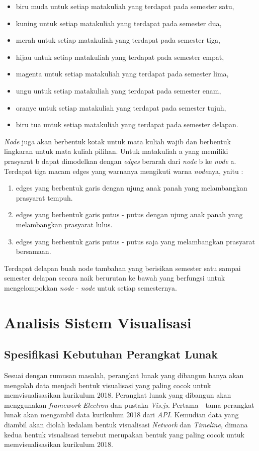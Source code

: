 \begin{itemize}
    \item biru muda untuk setiap matakuliah yang terdapat pada semester satu,
    \item kuning untuk setiap matakuliah yang terdapat pada semester dua,
    \item merah untuk setiap matakuliah yang terdapat pada semester tiga,
    \item hijau untuk setiap matakuliah yang terdapat pada semester empat,
    \item magenta untuk setiap matakuliah yang terdapat pada semester lima,
    \item ungu untuk setiap matakuliah yang terdapat pada semester enam,
    \item oranye untuk setiap matakuliah yang terdapat pada semester tujuh,
    \item biru tua untuk setiap matakuliah yang terdapat pada semester delapan.
\end{itemize}
\textit{Node} juga akan berbentuk kotak untuk mata kuliah wajib dan berbentuk lingkaran untuk mata kuliah pilihan. Untuk matakuliah a yang memiliki prasyarat b dapat dimodelkan dengan \textit{edges} berarah dari \textit{node} b ke \textit{node} a. Terdapat tiga macam edges yang warnanya mengikuti warna \textit{node}nya, yaitu :
\begin{enumerate}
    \item edges yang berbentuk garis dengan ujung anak panah yang melambangkan prasyarat tempuh.
    \item edges yang berbentuk garis putus - putus dengan ujung anak panah yang melambangkan prasyarat lulus.
    \item edges yang berbentuk garis putus - putus saja yang melambangkan prasyarat bersamaan.
\end{enumerate}
Terdapat delapan buah node tambahan yang berisikan semester satu sampai semester delapan secara naik berurutan ke bawah yang berfungsi untuk mengelompokkan \textit{node} - \textit{node} untuk setiap semesternya.

\section{Analisis Sistem Visualisasi}

\subsection{Spesifikasi Kebutuhan Perangkat Lunak}
Sesuai dengan rumusan masalah, perangkat lunak yang dibangun hanya akan mengolah data menjadi bentuk visualisasi yang paling cocok untuk memvisualisasikan kurikulum 2018. Perangkat lunak yang dibangun akan menggunakan \textit{framework} \textit{Electron} dan pustaka \textit{Vis.js}. Pertama - tama perangkat lunak akan mengambil data kurikulum 2018 dari \textit{API}. Kemudian data yang diambil akan diolah kedalam bentuk visualisasi \textit{Network} dan \textit{Timeline}, dimana kedua bentuk visualisasi tersebut merupakan bentuk yang paling cocok untuk memvisualisasikan kurikulum 2018.

